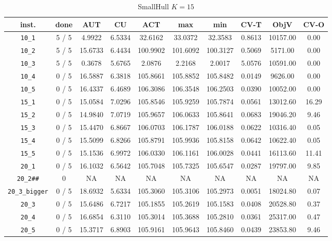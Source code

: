 \begin{table}[h!]
\begin{center}
\small
\begin{tabular}{| c | c | c | c | c | c | c | c | c | c |}
\hline
inst. & done & AUT & CU & ACT & max & min & CV-T & ObjV & CV-O \\
\hline
\verb|10_1| & 5 / 5 & 4.9922 & 6.5334 & 32.6162 & 33.0372 & 32.3583 & 0.8613 & 10157.00 & 0.00\\ 
\verb|10_2| & 5 / 5 & 15.6733 & 6.4434 & 100.9902 & 101.6092 & 100.3127 & 0.5069 & 5171.00 & 0.00\\ 
\verb|10_3| & 5 / 5 & 0.3678 & 5.6765 & 2.0876 & 2.2168 & 2.0017 & 5.0576 & 10591.00 & 0.00\\ 
\verb|10_4| & 0 / 5 & 16.5887 & 6.3818 & 105.8661 & 105.8852 & 105.8482 & 0.0149 & 9626.00 & 0.00\\ 
\verb|10_5| & 0 / 5 & 16.4337 & 6.4689 & 106.3086 & 106.3548 & 106.2503 & 0.0390 & 10052.00 & 0.00\\ 
\verb|15_1| & 0 / 5 & 15.0584 & 7.0296 & 105.8546 & 105.9259 & 105.7874 & 0.0561 & 13012.60 & 16.29\\ 
\verb|15_2| & 0 / 5 & 14.9840 & 7.0719 & 105.9657 & 106.0633 & 105.8641 & 0.0683 & 19046.20 & 9.46\\ 
\verb|15_3| & 0 / 5 & 15.4470 & 6.8667 & 106.0703 & 106.1787 & 106.0188 & 0.0622 & 10316.40 & 0.05\\ 
\verb|15_4| & 0 / 5 & 15.5099 & 6.8266 & 105.8791 & 105.9936 & 105.8158 & 0.0642 & 10622.40 & 0.05\\ 
\verb|15_5| & 0 / 5 & 15.1536 & 6.9972 & 106.0330 & 106.1161 & 106.0028 & 0.0441 & 16113.60 & 11.41\\ 
\verb|20_1| & 0 / 5 & 16.1032 & 6.5642 & 105.7048 & 105.7325 & 105.6547 & 0.0287 & 19797.00 & 9.85\\ 
\verb|20_2##| & 0 & NA & NA & NA & NA & NA & NA & NA & NA \\ 
\verb|20_3_bigger| & 0 / 5 & 18.6932 & 5.6334 & 105.3060 & 105.3106 & 105.2973 & 0.0051 & 18024.80 & 0.07\\ 
\verb|20_3| & 0 / 5 & 15.6486 & 6.7217 & 105.1855 & 105.2619 & 105.1583 & 0.0408 & 20528.80 & 0.37\\ 
\verb|20_4| & 0 / 5 & 16.6854 & 6.3110 & 105.3014 & 105.3688 & 105.2810 & 0.0361 & 25317.00 & 0.47\\ 
\verb|20_5| & 0 / 5 & 15.3717 & 6.8903 & 105.9161 & 105.9643 & 105.8460 & 0.0439 & 23853.80 & 9.46\\ 
\hline
\end{tabular}
\caption{SmallHull $K = 15$}
\label{table:hull:15}
\end{center}
\end{table}
